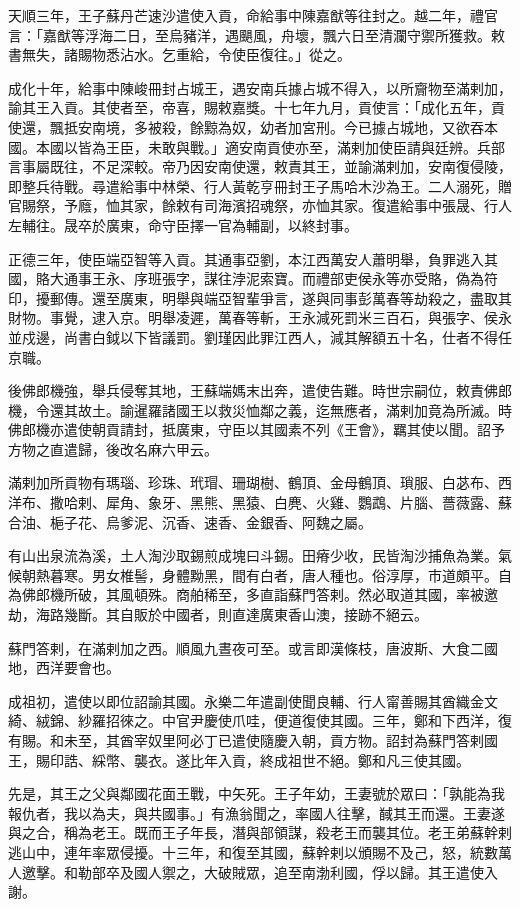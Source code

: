 \begin{pinyinscope}
天順三年，王子蘇丹芒速沙遣使入貢，命給事中陳嘉猷等往封之。越二年，禮官言：「嘉猷等浮海二日，至烏豬洋，遇颶風，舟壞，飄六日至清瀾守禦所獲救。敕書無失，諸賜物悉沾水。乞重給，令使臣復往。」從之。

成化十年，給事中陳峻冊封占城王，遇安南兵據占城不得入，以所齎物至滿剌加，諭其王入貢。其使者至，帝喜，賜敕嘉獎。十七年九月，貢使言：「成化五年，貢使還，飄抵安南境，多被殺，餘黥為奴，幼者加宮刑。今已據占城地，又欲吞本國。本國以皆為王臣，未敢與戰。」適安南貢使亦至，滿剌加使臣請與廷辨。兵部言事屬既往，不足深較。帝乃因安南使還，敕責其王，並諭滿剌加，安南復侵陵，即整兵待戰。尋遣給事中林榮、行人黃乾亨冊封王子馬哈木沙為王。二人溺死，贈官賜祭，予廕，恤其家，餘敕有司海濱招魂祭，亦恤其家。復遣給事中張晟、行人左輔往。晟卒於廣東，命守臣擇一官為輔副，以終封事。

正德三年，使臣端亞智等入貢。其通事亞劉，本江西萬安人蕭明舉，負罪逃入其國，賂大通事王永、序班張字，謀往浡泥索寶。而禮部吏侯永等亦受賂，偽為符印，擾郵傳。還至廣東，明舉與端亞智輩爭言，遂與同事彭萬春等劫殺之，盡取其財物。事覺，逮入京。明舉凌遲，萬春等斬，王永減死罰米三百石，與張字、侯永並戍邊，尚書白鉞以下皆議罰。劉瑾因此罪江西人，減其解額五十名，仕者不得任京職。

後佛郎機強，舉兵侵奪其地，王蘇端媽末出奔，遣使告難。時世宗嗣位，敕責佛郎機，令還其故土。諭暹羅諸國王以救災恤鄰之義，迄無應者，滿剌加竟為所滅。時佛郎機亦遣使朝貢請封，抵廣東，守臣以其國素不列《王會》，羈其使以聞。詔予方物之直遣歸，後改名麻六甲云。

滿剌加所貢物有瑪瑙、珍珠、玳瑁、珊瑚樹、鶴頂、金母鶴頂、瑣服、白苾布、西洋布、撒哈剌、犀角、象牙、黑熊、黑猿、白麂、火雞、鸚鵡、片腦、薔薇露、蘇合油、梔子花、烏爹泥、沉香、速香、金銀香、阿魏之屬。

有山出泉流為溪，土人淘沙取錫煎成塊曰斗錫。田瘠少收，民皆淘沙捕魚為業。氣候朝熱暮寒。男女椎髻，身體黝黑，間有白者，唐人種也。俗淳厚，市道頗平。自為佛郎機所破，其風頓殊。商舶稀至，多直詣蘇門答剌。然必取道其國，率被邀劫，海路幾斷。其自販於中國者，則直達廣東香山澳，接跡不絕云。

蘇門答剌，在滿剌加之西。順風九晝夜可至。或言即漢條枝，唐波斯、大食二國地，西洋要會也。

成祖初，遣使以即位詔諭其國。永樂二年遣副使聞良輔、行人甯善賜其酋織金文綺、絨錦、紗羅招徠之。中官尹慶使爪哇，便道復使其國。三年，鄭和下西洋，復有賜。和未至，其酋宰奴里阿必丁已遣使隨慶入朝，貢方物。詔封為蘇門答剌國王，賜印誥、綵幣、襲衣。遂比年入貢，終成祖世不絕。鄭和凡三使其國。

先是，其王之父與鄰國花面王戰，中矢死。王子年幼，王妻號於眾曰：「孰能為我報仇者，我以為夫，與共國事。」有漁翁聞之，率國人往擊，馘其王而還。王妻遂與之合，稱為老王。既而王子年長，潛與部領謀，殺老王而襲其位。老王弟蘇幹剌逃山中，連年率眾侵擾。十三年，和復至其國，蘇幹剌以頒賜不及己，怒，統數萬人邀擊。和勒部卒及國人禦之，大破賊眾，追至南渤利國，俘以歸。其王遣使入謝。


\end{pinyinscope}

